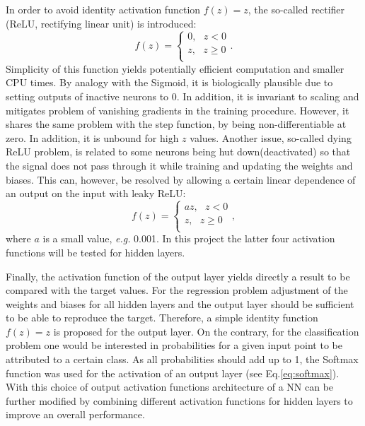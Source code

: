 \documentclass{emulateapj}
\begin{document}
In order to avoid identity activation function $f(z)=z$, the so-called rectifier (ReLU, rectifying linear unit) is introduced:
\begin{equation}
    f(z)=\begin{cases}
               0, \mbox{ }z<0\\
               z, \mbox{ } z\geq 0\\
            \end{cases}.
\end{equation}
Simplicity of this function yields potentially efficient computation and smaller CPU times. By analogy with the Sigmoid, it is biologically plausible due to setting outputs of inactive neurons to 0. In addition, it is invariant to scaling and mitigates problem of vanishing gradients in the training procedure. However, it shares the same problem with the step function, by being non-differentiable at zero. In addition, it is unbound for high $z$ values. Another issue, so-called dying ReLU problem, is related to some neurons being hut down(deactivated) so that the signal does not pass through it while training and updating the weights and biases. This can, however, be resolved by allowing a certain linear dependence of an output on the input with leaky ReLU:
\begin{equation}
    f(z)=\begin{cases}
               az, \mbox{ }z<0\\
               z, \mbox{ } z\geq 0\\
            \end{cases},
\end{equation}
where $a$ is a small value, \textit{e.g.} 0.001. In this project the latter four activation functions will be tested for hidden layers.

Finally, the activation function of the output layer yields directly a result to be compared with the target values. For the regression problem adjustment of the weights and biases for all hidden layers and the output layer should be sufficient to be able to reproduce the target. Therefore, a simple identity function $f(z)=z$ is proposed for the output layer. On the contrary, for the classification problem one would be interested in probabilities for a given input point to be attributed to a certain class. As all probabilities should add up to 1, the Softmax function was used for the activation of an output layer (see Eq.\ref{eq:softmax}). With this choice of output activation functions architecture of a NN can be further modified by combining different activation functions for hidden layers to improve an overall performance.
\end{document}
